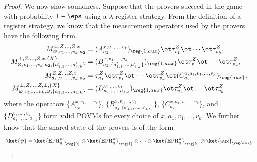 \begin{proof}
    We now show soundness. Suppose that the provers succeed in the game
    with probability $1 - \eps$ using a $\lambda$-register
    strategy. From the definition of a register strategy, we know that the measurement operators
    used by the provers have the following form.
    \begin{align*}
      M^{\bot, Z, \dots, Z, x}_{\varnothing, v_1, \dots, v_k, a_2} &=
      (A^{x, v_1, \dots, v_k}_{a_2})_{\reg{1, aux}} \ot \tau^Z_{v_1}
                                                                     \ot \cdots \ot \tau^Z_{v_k}, \\
      M^{\bot, Z, \dots, Z, x, \{X\}}_{\varnothing, v_1, \dots, v_k,
      a_2, \{a'_{1,1}, \dots, a'_{1,k}\}} &= (B^{x, v_1, \dots,
      v_k}_{a_2, \{a'_{1,1}, \dots, a'_{1,k}\}})_{\reg{1,aux}}
                                            \ot \tau^Z_{v_1} \ot \cdots  \ot \tau^Z_{v_k}, \\
      M^{Z, Z \dots, Z, x}_{a_1, v_1, \ldots, v_k, a_2} &= \tau^Z_{a_1}
                                                         \ot
                                                         \tau^Z_{v_1} \ot
                                                         \cdots \ot
                                                         \tau^Z_{v_k}
                                                         \ot (C^{x,
                                                         a_1, v_1,
                                                          \dots,
                                                          v_k}_{a_2})_{\reg{aux}},\\
      M^{\bot, Z, \dots, Z, \bot, \{X\}}_{\varnothing, v_1, \dots,
      v_k, \varnothing, \{a_{1,1}, \dots, a_{1,k}\}} &=  (D^{v_1,
                                                       \dots, v_k}_{a_{1,1},
                                                       \dotsm
                                                       a_{1,k}})_{\reg{1,aux}}
                                                       \ot
                                                       \tau^Z_{v_1}
                                                       \ot \dots \ot \tau^Z_{v_k}.
    \end{align*}
    where the operators $\{A^{x, v_1, \dots, v_k}_{a_2}\}$,
    $\{B^{x, v_1, \dots, v_k}_{a_2, \{a'_{1,1}, \dots, a'_{1,k}\}}\}$,
    $\{C^{x, a_1, v_1, \ldots, v_k}_{a_2}\}$, and $\{D^{v_1, \dots,
      v_k}_{a_{1,1}, \dots, a_{1,k}}\}$ form
    valid POVMs for every choice of $x, a_1, v_1, \dots, v_k$. We further
    know that the shared state of the provers is of the form
    \[ \
\ket{\psi}
=
\ket{\mathrm{EPR}_q^n}_{\reg{0}}
\otimes \ket{\mathrm{EPR}_q^n}_{\reg{1}}
\otimes
\cdots
\otimes
\ket{\mathrm{EPR}_q^n}_{\reg{k}}
\otimes
\ket{\mathrm{aux}}_{\reg{aux}}. \]


\end{proof}
